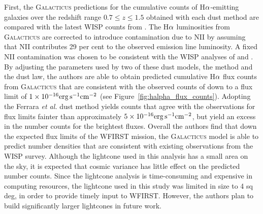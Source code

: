 First, the \textsc{Galacticus} predictions for the cumulative counts of H${\rm
\alpha}$-emitting galaxies over the redshift range $0.7\leqslant z\leqslant 1.5$
obtained with each dust method are compared with the latest WISP counts from
\citet{Mehta:2015}. The H${\rm \alpha}$ luminosities from \textsc{Galacticus} are
corrected to introduce contamination due to NII by assuming that NII contributes
29 per cent to the observed emission line luminosity. A fixed NII contamination
was chosen to be consistent with the WISP analyses of \citet{Colbert13} and
\citet{Mehta:2015}. By adjusting the parameters used by two of these dust models,
the \citet{Charlot00} method and the \citet{Calzetti00} dust law, the authors
are able to obtain predicted cumulative H${\rm \alpha}$ flux counts from
\textsc{Galacticus} that are consistent with the observed counts of \citet{Mehta:2015} down to a flux limit of $1\times 10^{-16}{\rm
erg}\,{\rm s}^{-1}{\rm cm}^{-2}$ (see Figure~\ref{fig:halpha_flux_counts}).
Adopting the Ferrara \textit{et al.} \citet{Ferrara99} dust method yields counts
that agree with the observations for flux limits fainter than approximately
$5\times 10^{-16}{\rm erg}\,{\rm s}^{-1}{\rm cm}^{-2}$, but yield an excess in
the number counts for the brightest fluxes. Overall the authors find that down
the expected flux limits of the WFIRST mission, the \textsc{Galacticus} model is
able to predict number densities that are consistent with existing observations
from the WISP survey. Although the lightcone used in this analysis has a small
area on the sky, it is expected that cosmic variance has little effect on the
predicted number counts. Since the lightcone analysis is time-consuming and
expensive in computing resources, the lightcone used in this study was limited
in size to 4 sq deg, in order to provide timely input to WFIRST. However, the
authors plan to build significantly larger lightcones in future work.


